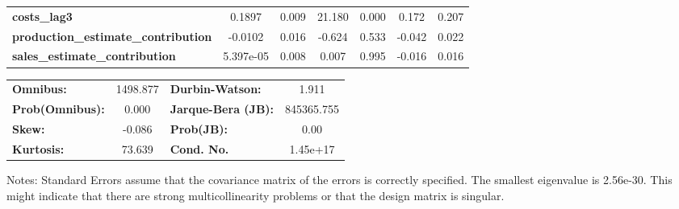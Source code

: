 \begin{center}
\begin{tabular}{lcccccc}
\textbf{costs\_lag3}                        &       0.1897  &        0.009     &    21.180  &         0.000        &        0.172    &        0.207     \\
\textbf{production\_estimate\_contribution} &      -0.0102  &        0.016     &    -0.624  &         0.533        &       -0.042    &        0.022     \\
\textbf{sales\_estimate\_contribution}      &    5.397e-05  &        0.008     &     0.007  &         0.995        &       -0.016    &        0.016     \\
\bottomrule
\end{tabular}
\begin{tabular}{lclc}
\textbf{Omnibus:}       & 1498.877 & \textbf{  Durbin-Watson:     } &     1.911   \\
\textbf{Prob(Omnibus):} &   0.000  & \textbf{  Jarque-Bera (JB):  } & 845365.755  \\
\textbf{Skew:}          &  -0.086  & \textbf{  Prob(JB):          } &      0.00   \\
\textbf{Kurtosis:}      &  73.639  & \textbf{  Cond. No.          } &  1.45e+17   \\
\bottomrule
\end{tabular}
\end{center}

Notes: \newline
 [1] Standard Errors assume that the covariance matrix of the errors is correctly specified. \newline
 [2] The smallest eigenvalue is 2.56e-30. This might indicate that there are \newline
 strong multicollinearity problems or that the design matrix is singular.